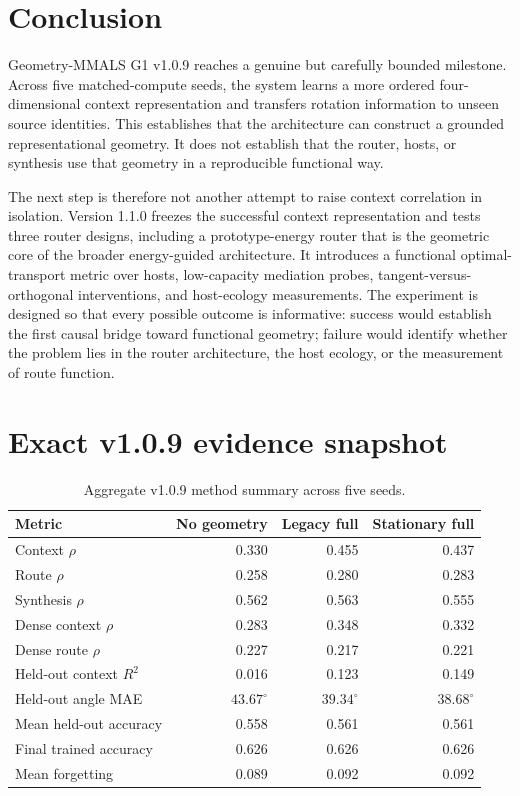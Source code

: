 \documentclass[11pt,a4paper]{article}
\begin{document}
\section{Conclusion}

Geometry-MMALS G1 v1.0.9 reaches a genuine but carefully bounded milestone. Across five matched-compute seeds, the system learns a more ordered four-dimensional context representation and transfers rotation information to unseen source identities. This establishes that the architecture can construct a grounded representational geometry. It does not establish that the router, hosts, or synthesis use that geometry in a reproducible functional way.

The next step is therefore not another attempt to raise context correlation in isolation. Version 1.1.0 freezes the successful context representation and tests three router designs, including a prototype-energy router that is the geometric core of the broader energy-guided architecture. It introduces a functional optimal-transport metric over hosts, low-capacity mediation probes, tangent-versus-orthogonal interventions, and host-ecology measurements. The experiment is designed so that every possible outcome is informative: success would establish the first causal bridge toward functional geometry; failure would identify whether the problem lies in the router architecture, the host ecology, or the measurement of route function.

\appendix
\section{Exact v1.0.9 evidence snapshot}

\begin{table}[H]
\centering
\caption{Aggregate v1.0.9 method summary across five seeds.}
\begin{tabular}{@{}lrrr@{}}
\toprule
Metric & No geometry & Legacy full & Stationary full\\
\midrule
Context $\rho$ & 0.330 & 0.455 & 0.437\\
Route $\rho$ & 0.258 & 0.280 & 0.283\\
Synthesis $\rho$ & 0.562 & 0.563 & 0.555\\
Dense context $\rho$ & 0.283 & 0.348 & 0.332\\
Dense route $\rho$ & 0.227 & 0.217 & 0.221\\
Held-out context $R^2$ & 0.016 & 0.123 & 0.149\\
Held-out angle MAE & $43.67^\circ$ & $39.34^\circ$ & $38.68^\circ$\\
Mean held-out accuracy & 0.558 & 0.561 & 0.561\\
Final trained accuracy & 0.626 & 0.626 & 0.626\\
Mean forgetting & 0.089 & 0.092 & 0.092\\
\bottomrule
\end{tabular}
\end{table}
\end{document}
